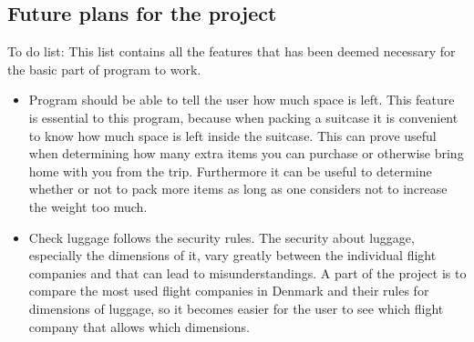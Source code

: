 \subsection{Future plans for the project}


To do list:
This list contains all the features that has been deemed necessary for the basic part of program to work.

\begin{itemize}
\item Program should be able to tell the user how much space is left.
This feature is essential to this program, because when packing a suitcase it is convenient to know how much space is left inside the suitcase. This can prove useful when determining how many extra items you can purchase or otherwise bring home with you from the trip. Furthermore it can be useful to determine whether or not to pack more items as long as one considers not to increase the weight too much.

\item Check luggage follows the security rules.
The security about luggage, especially the dimensions of it, vary greatly between the individual flight companies and that can lead to misunderstandings. A part of the project is to compare the most used flight companies in Denmark and their rules for dimensions of luggage, so it becomes easier for the user to see which flight company that allows which dimensions. 
\end{itemize}

